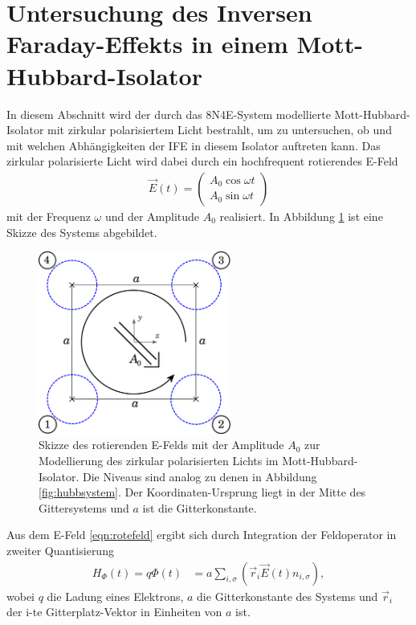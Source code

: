\section{Untersuchung des Inversen Faraday-Effekts in einem Mott-Hubbard-Isolator}
\label{sec:untersuchungife}

In diesem Abschnitt wird der durch das 8N4E-System modellierte Mott-Hubbard-Isolator mit zirkular polarisiertem Licht bestrahlt,
um zu untersuchen, ob und mit welchen Abhängigkeiten der IFE in diesem Isolator auftreten kann.
Das zirkular polarisierte Licht wird dabei durch ein hochfrequent rotierendes E-Feld
\begin{align}
  \vec{E}(t) =
  \begin{pmatrix}
    A_0 \cos{\omega t} \\
    A_0 \sin{\omega t}
  \end{pmatrix}
  \label{eqn:rotefeld}
\end{align}
mit der Frequenz $\omega$ und der Amplitude $A_0$ realisiert.
In Abbildung \ref{fig:ifemott} ist eine Skizze des Systems abgebildet.
\begin{figure}
  \centering
  \includegraphics[height = 6cm]{Graphiken/ife_mott_system.pdf}
  \caption{Skizze des rotierenden E-Felds mit der Amplitude $A_0$ zur Modellierung des zirkular polarisierten Lichts im Mott-Hubbard-Isolator. Die Niveaus sind analog zu denen
  in Abbildung \ref{fig:hubbsystem}. Der Koordinaten-Ursprung liegt in der Mitte des Gittersystems und $a$ ist die Gitterkonstante.}
  \label{fig:ifemott}
\end{figure}
Aus dem E-Feld \eqref{eqn:rotefeld} ergibt sich durch Integration der Feldoperator in zweiter Quantisierung
\begin{align}
  H_{\Phi}(t) = q \Phi(t) & = a \sum_{i,\sigma} \left(\vec{r}_i \vec{E}(t) n_{i,\sigma}\right),
  \label{eqn:qPhi}
\end{align}
wobei $q$ die Ladung eines Elektrons, $a$ die Gitterkonstante des Systems und $\vec{r}_i$ der i-te Gitterplatz-Vektor in Einheiten von $a$ ist.
